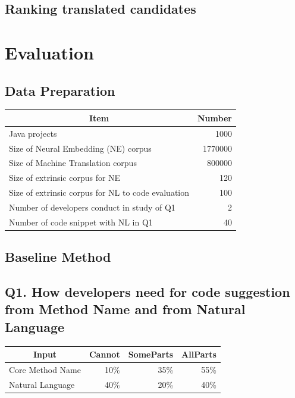 \documentclass[sigconf,review,anonymous]{article}
\begin{document}
\subsection{Ranking translated candidates }
\section{Evaluation}
\subsection{Data Preparation}
\begin{table}[]
\centering
\begin{tabular}{|l|r|}
\hline
\multicolumn{1}{|c|}{\textbf{Item}}                & \multicolumn{1}{c|}{\textbf{Number}} \\ \hline
Java projects                                      & 1000                                 \\ \hline
Size of Neural Embedding (NE) corpus               & 1770000                              \\ \hline
Size of Machine Translation corpus                 & 800000                               \\ \hline
Size of extrinsic corpus for NE                    & 120                                  \\ \hline
Size of extrinsic corpus for NL to code evaluation & 100                                  \\ \hline
Number of developers conduct in study of Q1        & 2                                    \\ \hline
Number of code snippet with NL in Q1               & 40                                   \\ \hline
\end{tabular}
\end{table}
\subsection{Baseline Method}
\subsection{Q1. How developers need for code suggestion from Method Name and from Natural Language}

\begin{table}[]
\centering
\begin{tabular}{|l|r|r|r|}
\hline
\multicolumn{1}{|c|}{\textbf{Input}} & \multicolumn{1}{l|}{\textbf{Cannot}} & \multicolumn{1}{l|}{\textbf{SomeParts}} & \multicolumn{1}{l|}{\textbf{AllParts}} \\ \hline
Core Method Name                     & 10\%                                 & 35\%                                    & 55\%                                   \\ \hline
Natural Language                     & 40\%                                 & 20\%                                    & 40\%                                   \\ \hline
\end{tabular}
\end{table}
\end{document}
